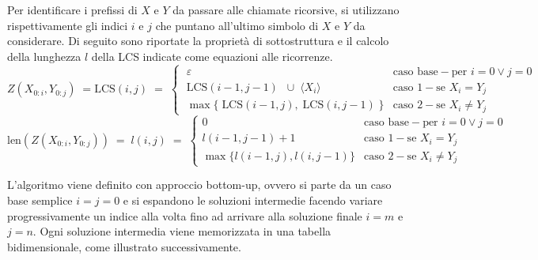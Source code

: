 \noindent
Per identificare i prefissi di \(X\) e \(Y\) da passare alle chiamate ricorsive, si utilizzano rispettivamente gli
indici \(i\) e \(j\) che puntano all'ultimo simbolo di \(X\) e \(Y\) da considerare. Di seguito sono riportate la proprietà
di sottostruttura e il calcolo della lunghezza \(l\) della LCS indicate come equazioni alle ricorrenze.
\[Z(X_{0:i}, Y_{0:j}) \; = \text{LCS}(i, j) \; = \; \begin{cases}
	\; \varepsilon & \text{caso base} - \text{per } i = 0 \vee j = 0 \\[3pt]
	\; \text{LCS}(i-1, j-1) \;\; \cup \; \langle X_i \rangle & \text{caso 1} - \text{se } X_i = Y_j \\[3pt]
	\; \max \{\; \text{LCS}(i-1, j), \; \text{LCS}(i, j-1)\; \} & \text{caso 2} - \text{se } X_i \neq Y_j
\end{cases}\]
\[\text{len}(Z(X_{0:i}, Y_{0:j})) \; = \; l(i, j) \; = \; \begin{cases}
	0 & \text{caso base} - \text{per } i = 0 \vee j = 0 \\[3pt]
	l(i-1, j-1) + 1 & \text{caso 1} - \text{se }X_i = Y_j \\[3pt]
	\max \{ l(i-1, j), l(i, j-1) \} & \text{caso 2} - \text{se } X_i \neq Y_j
\end{cases}\]

\vspace{5pt}

\noindent
L'algoritmo viene definito con approccio bottom-up, ovvero si parte da un caso base semplice \(i = j = 0\) e si
espandono le soluzioni intermedie facendo variare progressivamente un indice alla volta fino ad arrivare alla soluzione
finale \(i = m\) e \(j = n\). Ogni soluzione intermedia viene memorizzata in una tabella bidimensionale, come illustrato
successivamente.

\newpage


